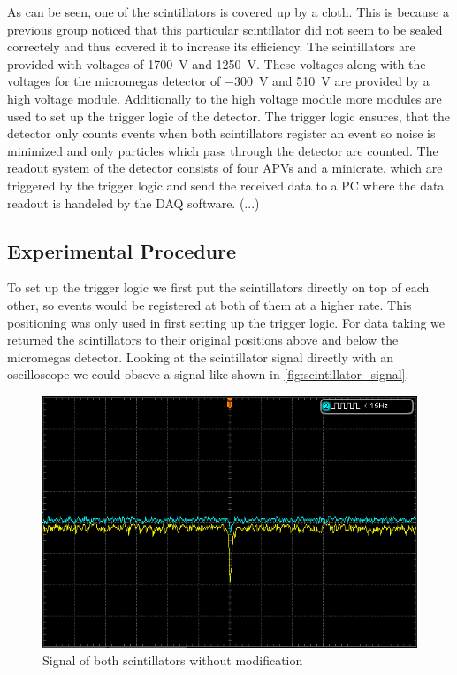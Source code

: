 \documentclass[sn-mathphys-num,iicol]{sn-jnl}
\theoremstyle{thmstyleone}
\theoremstyle{thmstyletwo}
\theoremstyle{thmstylethree}
\begin{document}
As can be seen, one of the scintillators is covered up by a cloth. This is because a previous group noticed that this particular scintillator did not seem to be sealed correctely and thus covered it to increase its efficiency.
The scintillators are provided with voltages of \SI{1700}{\volt} and \SI{1250}{\volt}. These voltages along with the voltages for the micromegas detector of \SI{-300}{\volt} and \SI{510}{\volt} are provided by a high voltage module.
Additionally to the high voltage module more modules are used to set up the trigger logic of the detector.
The trigger logic ensures, that the detector only counts events when both scintillators register an event so noise is minimized and only particles which pass through the detector are counted.
The readout system of the detector consists of four APVs and a minicrate, which are triggered by the trigger logic and send the received data to a PC where the data readout is handeled by the DAQ software.
(...) %

\subsection{Experimental Procedure}
To set up the trigger logic we first put the scintillators directly on top of each other, so events would be registered at both of them at a higher rate.
This positioning was only used in first setting up the trigger logic.
For data taking we returned the scintillators to their original positions above and below the micromegas detector.
Looking at the scintillator signal directly with an oscilloscope we could obseve a signal like shown in \autoref{fig:scintillator_signal}.

\begin{figure}
  \includegraphics[width=\linewidth]{figures/DS1Z_QuickPrint5_cropped.png}
  \caption{Signal of both scintillators without modification}
  \label{fig:scintillator_signal}
\end{figure}
\end{document}
